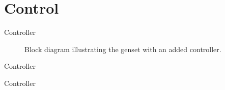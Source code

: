 

\section{Control}




\begin{frame}{Controller}{}

\begin{figure}[H]
\centering
 
\caption{ Block diagram illustrating the genset with an added controller.}
\end{figure}

\end{frame}


\begin{frame}{Controller}{}
\begin{figure}[H]
\centering
 
\caption{}
\end{figure}

\end{frame}




\begin{frame}{Controller}{}

\begin{figure}[H]
\centering
 
\caption{}
\end{figure}


\end{frame}

